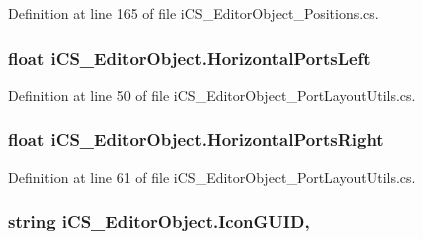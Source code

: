 Definition at line 165 of file i\+C\+S\+\_\+\+Editor\+Object\+\_\+\+Positions.\+cs.

\hypertarget{classi_c_s___editor_object_a781ad3d9b4f609263bb798387016ca61}{
\subsubsection[{Horizontal\+Ports\+Left}]{\setlength{\rightskip}{0pt plus 5cm}float i\+C\+S\+\_\+\+Editor\+Object.\+Horizontal\+Ports\+Left\hspace{0.3cm}{\ttfamily [get]}}}\label{classi_c_s___editor_object_a781ad3d9b4f609263bb798387016ca61}


Definition at line 50 of file i\+C\+S\+\_\+\+Editor\+Object\+\_\+\+Port\+Layout\+Utils.\+cs.

\hypertarget{classi_c_s___editor_object_a9d530b0709f953879ae722eb7cc057d4}{
\subsubsection[{Horizontal\+Ports\+Right}]{\setlength{\rightskip}{0pt plus 5cm}float i\+C\+S\+\_\+\+Editor\+Object.\+Horizontal\+Ports\+Right\hspace{0.3cm}{\ttfamily [get]}}}\label{classi_c_s___editor_object_a9d530b0709f953879ae722eb7cc057d4}


Definition at line 61 of file i\+C\+S\+\_\+\+Editor\+Object\+\_\+\+Port\+Layout\+Utils.\+cs.

\hypertarget{classi_c_s___editor_object_aef7b4971840ed269717d65c5c6740063}{
\subsubsection[{Icon\+G\+U\+I\+D}]{\setlength{\rightskip}{0pt plus 5cm}string i\+C\+S\+\_\+\+Editor\+Object.\+Icon\+G\+U\+I\+D\hspace{0.3cm}{\ttfamily [get]}, {\ttfamily [set]}}}\label{classi_c_s___editor_object_aef7b4971840ed269717d65c5c6740063}


